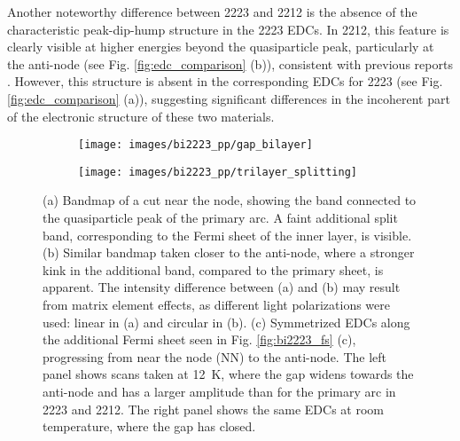 Another noteworthy difference between 2223 and 2212 is the absence of the characteristic peak-dip-hump structure in the 2223 EDCs.
In 2212, this feature is clearly visible at higher energies beyond the quasiparticle peak, particularly at the anti-node (see Fig. \ref{fig:edc_comparison} (b)), consistent with previous reports \cite{kordyuk_origin_2002}.
However, this structure is absent in the corresponding EDCs for 2223 (see Fig. \ref{fig:edc_comparison} (a)), suggesting significant differences in the incoherent part of the electronic structure of these two materials.

\begin{figure}
	\centering
	\begin{subfigure}[b]{\linewidth}
		\texttt{[image: images/bi2223\_pp/gap\_bilayer]}
	\end{subfigure}
	\caption{(a) Evolution of EDCs across the primary Fermi arc of 2223, with the positions of the EDCs corresponding to the markers in Fig. \ref{fig:bi2223_fs} (a). The left panel shows the EDCs at \qty{12}{\kelvin}. From the anti-node at (\qty{-0.55}{\per\angstrom}, \qty{0.18}{\per\angstrom}) across the arc to the opposite anti-node near (\qty{-0.2}{\per\angstrom}, \qty{0.48}{\per\angstrom}), a superconducting gap is observed, which continuously closes towards the node and reopens afterward. The right panel shows the same EDCs at room temperature (RT), where the gap has disappeared. (b) The same EDCs along the Fermi arc of 2212, where, in general, a larger gap is observed compared to the primary arc of 2223.}
	\label{fig:gap_bilayer}
	\centering
	\begin{subfigure}[b]{\linewidth}
		\texttt{[image: images/bi2223\_pp/trilayer\_splitting]}
	\end{subfigure}
	\caption{(a) Bandmap of a cut near the node, showing the band connected to the quasiparticle peak of the primary arc. A faint additional split band, corresponding to the Fermi sheet of the inner  layer, is visible. (b) Similar bandmap taken closer to the anti-node, where a stronger kink in the additional band, compared to the primary sheet, is apparent. The intensity difference between (a) and (b) may result from matrix element effects, as different light polarizations were used: linear in (a) and circular in (b). (c) Symmetrized EDCs along the additional Fermi sheet seen in Fig. \ref{fig:bi2223_fs} (c), progressing from near the node (NN) to the anti-node. The left panel shows scans taken at \qty{12}{\kelvin}, where the gap widens towards the anti-node and has a larger amplitude than for the primary arc in 2223 and 2212. The right panel shows the same EDCs at room temperature, where the gap has closed.}
	\label{fig:trilayer_splitting}
\end{figure}

